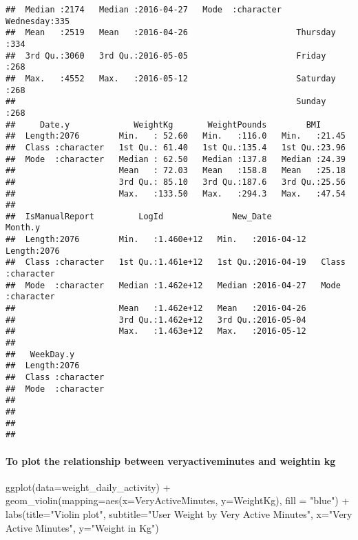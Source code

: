 \documentclass[
]{article}
\newenvironment{Shaded}{\begin{snugshade}}{\end{snugshade}}
\newcommand{\AttributeTok}[1]{\textcolor[rgb]{0.77,0.63,0.00}{#1}}
\newcommand{\FunctionTok}[1]{\textcolor[rgb]{0.00,0.00,0.00}{#1}}
\newcommand{\NormalTok}[1]{#1}
\newcommand{\SpecialCharTok}[1]{\textcolor[rgb]{0.00,0.00,0.00}{#1}}
\newcommand{\StringTok}[1]{\textcolor[rgb]{0.31,0.60,0.02}{#1}}
\begin{document}
\begin{verbatim}
##  Median :2174   Median :2016-04-27   Mode  :character   Wednesday:335  
##  Mean   :2519   Mean   :2016-04-26                      Thursday :334  
##  3rd Qu.:3060   3rd Qu.:2016-05-05                      Friday   :268  
##  Max.   :4552   Max.   :2016-05-12                      Saturday :268  
##                                                         Sunday   :268  
##     Date.y             WeightKg       WeightPounds        BMI       
##  Length:2076        Min.   : 52.60   Min.   :116.0   Min.   :21.45  
##  Class :character   1st Qu.: 61.40   1st Qu.:135.4   1st Qu.:23.96  
##  Mode  :character   Median : 62.50   Median :137.8   Median :24.39  
##                     Mean   : 72.03   Mean   :158.8   Mean   :25.18  
##                     3rd Qu.: 85.10   3rd Qu.:187.6   3rd Qu.:25.56  
##                     Max.   :133.50   Max.   :294.3   Max.   :47.54  
##                                                                     
##  IsManualReport         LogId              New_Date            Month.y         
##  Length:2076        Min.   :1.460e+12   Min.   :2016-04-12   Length:2076       
##  Class :character   1st Qu.:1.461e+12   1st Qu.:2016-04-19   Class :character  
##  Mode  :character   Median :1.462e+12   Median :2016-04-27   Mode  :character  
##                     Mean   :1.462e+12   Mean   :2016-04-26                     
##                     3rd Qu.:1.462e+12   3rd Qu.:2016-05-04                     
##                     Max.   :1.463e+12   Max.   :2016-05-12                     
##                                                                                
##   WeekDay.y        
##  Length:2076       
##  Class :character  
##  Mode  :character  
##                    
##                    
##                    
## 
\end{verbatim}

\hypertarget{to-plot-the-relationship-between-veryactiveminutes-and-weightin-kg}{%
\paragraph{To plot the relationship between veryactiveminutes and
weightin
kg}\label{to-plot-the-relationship-between-veryactiveminutes-and-weightin-kg}}

\begin{Shaded}
\begin{Highlighting}[]
\FunctionTok{ggplot}\NormalTok{(}\AttributeTok{data=}\NormalTok{weight\_daily\_activity) }\SpecialCharTok{+} \FunctionTok{geom\_violin}\NormalTok{(}\AttributeTok{mapping=}\FunctionTok{aes}\NormalTok{(}\AttributeTok{x=}\NormalTok{VeryActiveMinutes, }\AttributeTok{y=}\NormalTok{WeightKg), }\AttributeTok{fill =} \StringTok{"blue"}\NormalTok{) }\SpecialCharTok{+}
\FunctionTok{labs}\NormalTok{(}\AttributeTok{title=}\StringTok{"Violin plot"}\NormalTok{, }\AttributeTok{subtitle=}\StringTok{"User Weight by Very Active Minutes"}\NormalTok{, }\AttributeTok{x=}\StringTok{"Very Active Minutes"}\NormalTok{, }\AttributeTok{y=}\StringTok{"Weight in Kg"}\NormalTok{)}
\end{Highlighting}
\end{Shaded}
\end{document}
